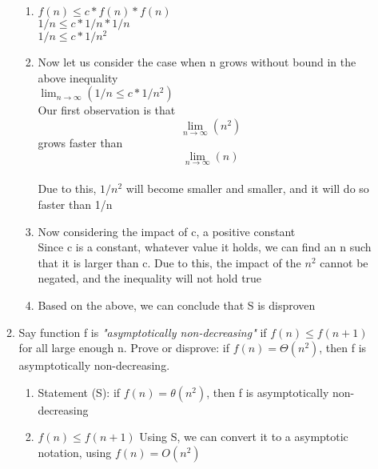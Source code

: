 \documentclass[11pt]{article}
\begin{document}
\begin{enumerate}
\begin{enumerate}
\begin{enumerate}
            \item $f(n) \leq c * f(n) * f(n)$\\
            $1/n \leq c * 1/n * 1/n$\\
            $1/n \leq c * 1/n^2$\\
            
            \item Now let us consider the case when n grows without bound in the above inequality\\
             $\lim_{n\to\infty} (1/n \leq c * 1/n^2)$ \\
             Our first observation is that \[ \lim_{n\to\infty} (n^2) \] grows faster than \[ \lim_{n\to\infty} (n) \]\\
             Due to this, $1/n^2$ will become smaller and smaller, and it will do so faster than 1/n
             
            \item Now considering the impact of c, a positive constant \\
            Since c is a constant, whatever value it holds, we can find an n such that it is larger than c. Due to this, the impact of the $n^2$ cannot be negated, and the inequality will not hold true
            \item Based on the above, we can conclude that S is disproven
        \end{enumerate}

        \item Say function f is \textit{"asymptotically non-decreasing"} if $f(n)≤f(n+1)$ for all large enough n. Prove or disprove: if $f(n)=Θ(n^2)$, then f is asymptotically non-decreasing.
        
        \begin{enumerate}
            \item Statement (S): if $f(n) = \theta(n^2)$, then f is asymptotically non-decreasing
            \item $f(n) \leq f(n+1)$ \hspace{1cm} Using S, we can convert it to a asymptotic notation, using $f(n) = O(n^2)$\\
            
        \end{enumerate}
        
    \end{enumerate}



\end{enumerate}
\end{document}
